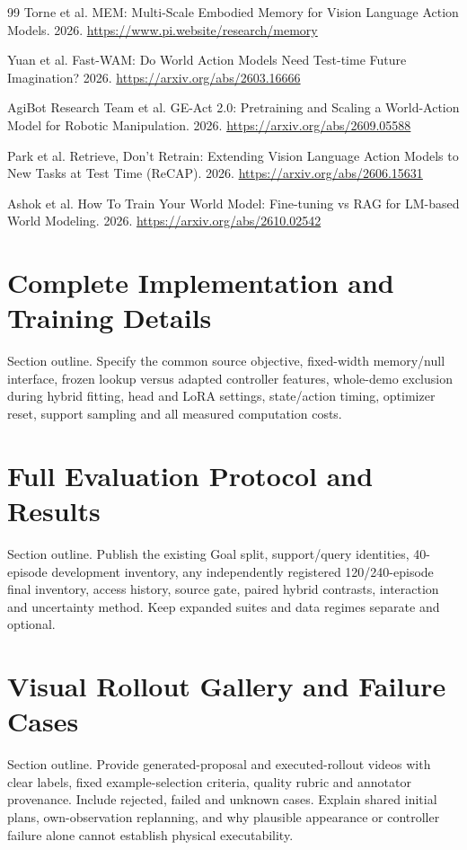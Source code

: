 \documentclass[11pt,a4paper]{article}
\begin{document}
\begin{thebibliography}{99}
Torne et al. MEM: Multi-Scale Embodied Memory for Vision Language Action Models. 2026. \url{https://www.pi.website/research/memory}

Yuan et al. Fast-WAM: Do World Action Models Need Test-time Future Imagination? 2026. \url{https://arxiv.org/abs/2603.16666}

AgiBot Research Team et al. GE-Act 2.0: Pretraining and Scaling a World-Action Model for Robotic Manipulation. 2026. \url{https://arxiv.org/abs/2609.05588}

Park et al. Retrieve, Don't Retrain: Extending Vision Language Action Models to New Tasks at Test Time (ReCAP). 2026. \url{https://arxiv.org/abs/2606.15631}

Ashok et al. How To Train Your World Model: Fine-tuning vs RAG for LM-based World Modeling. 2026. \url{https://arxiv.org/abs/2610.02542}

\end{thebibliography}

\appendix

\section{Complete Implementation and Training Details}

Section outline. Specify the common source objective, fixed-width memory/null interface, frozen lookup versus adapted controller features, whole-demo exclusion during hybrid fitting, head and LoRA settings, state/action timing, optimizer reset, support sampling and all measured computation costs.

\section{Full Evaluation Protocol and Results}

Section outline. Publish the existing Goal split, support/query identities, 40-episode development inventory, any independently registered 120/240-episode final inventory, access history, source gate, paired hybrid contrasts, interaction and uncertainty method. Keep expanded suites and data regimes separate and optional.

\section{Visual Rollout Gallery and Failure Cases}

Section outline. Provide generated-proposal and executed-rollout videos with clear labels, fixed example-selection criteria, quality rubric and annotator provenance. Include rejected, failed and unknown cases. Explain shared initial plans, own-observation replanning, and why plausible appearance or controller failure alone cannot establish physical executability.
\end{document}
